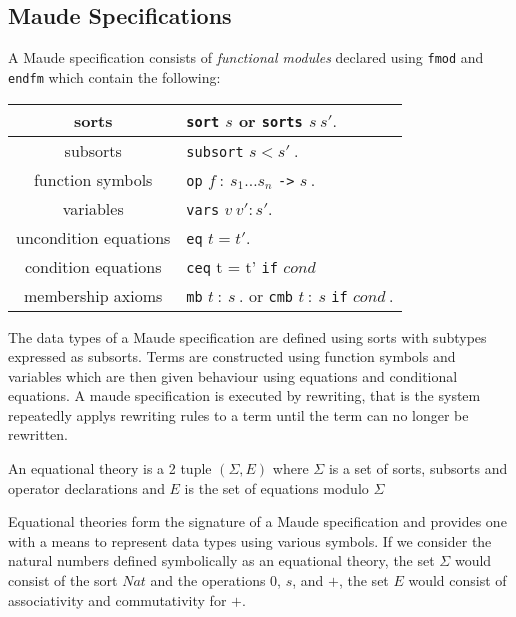 \subsection{Maude Specifications}

A Maude specification consists of \emph{functional modules} declared using \texttt{fmod} and \texttt{endfm} which contain the following:

\medskip
\begin{center}
\begin{tabular}{| c | l |}
\hline
sorts    & \texttt{sort} $s$ or \texttt{sorts}  $s \ s' .$ \\ \hline
subsorts  & \texttt{subsort} $s < s' \ .$ \\ \hline
function symbols  & \texttt{op} $f \ :  \ s_1 \ldots s_n$ \texttt{->} $s \ .$ \\ \hline
variables  & \texttt{vars} $v \ v' : s' .$\\ \hline
uncondition equations  &\texttt{eq} $t = t' .$\\ \hline
condition equations & \texttt{ceq} t = t' \texttt{if} $cond$ \\ \hline
membership axioms & \texttt{mb} $t \ : \ s \ .$ or \texttt{cmb} $t  \ : \ s$ \texttt{if} $cond \ .$  \\ \hline
\end{tabular}
\end{center}
\medskip
The data types of a Maude specification are defined using sorts with subtypes expressed as subsorts. Terms are constructed using function symbols and variables which are then  given behaviour using equations and conditional equations.  A maude specification is executed by rewriting, that is the system repeatedly applys rewriting rules to a term until the term can no longer be rewritten.

\medskip
\begin{mydef}
An equational theory is a 2 tuple $(\Sigma, E)$ where $\Sigma$ is a set of sorts, subsorts and operator declarations  and $E$ is the set of equations modulo $\Sigma$
\end{mydef}

Equational theories  form the signature of a Maude specification and provides one with a means to represent data types using various symbols. If we consider the natural numbers defined symbolically  as an equational theory, the set $\Sigma$ would consist of the sort $Nat$ and the operations $0$, $s$, and $+$, the set $E$ would consist of associativity and commutativity for $+$.

